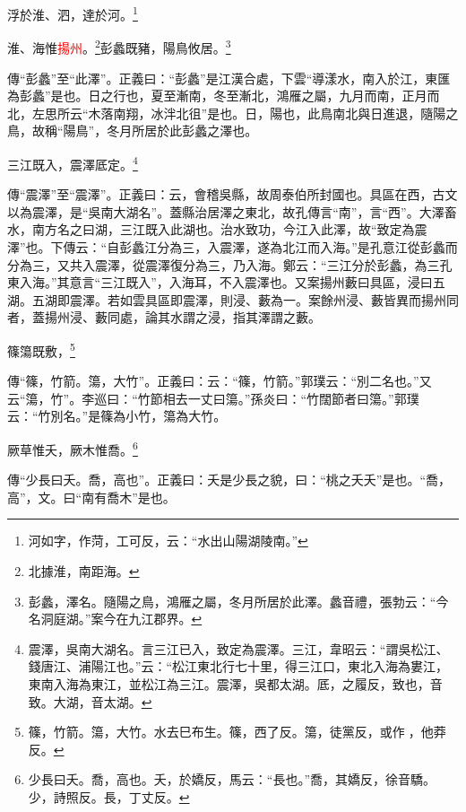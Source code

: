 浮於淮、泗，達於河。\footnote{河如字，作菏，工可反，云：“水出山陽湖陵南。”}

淮、海惟\textcolor{red}{揚州}。\footnote{北據淮，南距海。}彭蠡既豬，陽鳥攸居。\footnote{彭蠡，澤名。隨陽之鳥，鴻雁之屬，冬月所居於此澤。蠡音禮，張勃云：“今名洞庭湖。”案今在九江郡界。}

{\noindent\zhuan{}\fzbyks 傳“彭蠡”至“此澤”。正義曰：“彭蠡”是江漢合處，下雲“導漾水，南入於江，東匯為彭蠡”是也。日之行也，夏至漸南，冬至漸北，鴻雁之屬，九月而南，正月而北，左思所云“木落南翔，冰泮北徂”是也。日，陽也，此鳥南北與日進退，隨陽之鳥，故稱“陽鳥”，冬月所居於此彭蠡之澤也。 \par}

三江既入，震澤厎定。\footnote{震澤，吳南大湖名。言三江已入，致定為震澤。三江，韋昭云：“謂吳松江、錢唐江、浦陽江也。”云：“松江東北行七十里，得三江口，東北入海為婁江，東南入海為東江，並松江為三江。震澤，吳都太湖。厎，之履反，致也，音致。大湖，音太湖。}

{\noindent\zhuan{}\fzbyks 傳“震澤”至“震澤”。正義曰：云，會稽吳縣，故周泰伯所封國也。具區在西，古文以為震澤，是“吳南大湖名”。蓋縣治居澤之東北，故孔傳言“南”，言“西”。大澤畜水，南方名之曰湖，三江既入此湖也。治水致功，今江入此澤，故“致定為震澤”也。下傳云：“自彭蠡江分為三，入震澤，遂為北江而入海。”是孔意江從彭蠡而分為三，又共入震澤，從震澤復分為三，乃入海。鄭云：“三江分於彭蠡，為三孔東入海。”其意言“三江既入”，入海耳，不入震澤也。又案揚州藪曰具區，浸曰五湖。五湖即震澤。若如雲具區即震澤，則浸、藪為一。案餘州浸、藪皆異而揚州同者，蓋揚州浸、藪同處，論其水謂之浸，指其澤謂之藪。 \par}

篠簜既敷，\footnote{篠，竹箭。簜，大竹。水去巳布生。篠，西了反。簜，徒黨反，或作𥯕，他莽反。}

{\noindent\zhuan{}\fzbyks 傳“篠，竹箭。簜，大竹”。正義曰：云：“篠，竹箭。”郭璞云：“別二名也。”又云“簜，竹”。李巡曰：“竹節相去一丈曰簜。”孫炎曰：“竹闊節者曰簜。”郭璞云：“竹別名。”是篠為小竹，簜為大竹。 \par}

厥草惟夭，厥木惟喬。\footnote{少長曰夭。喬，高也。夭，於嬌反，馬云：“長也。”喬，其嬌反，徐音驕。少，詩照反。長，丁丈反。}

{\noindent\zhuan{}\fzbyks 傳“少長曰夭。喬，高也”。正義曰：夭是少長之貌，曰：“桃之夭夭”是也。“喬，高”，文。曰“南有喬木”是也。 \par}

